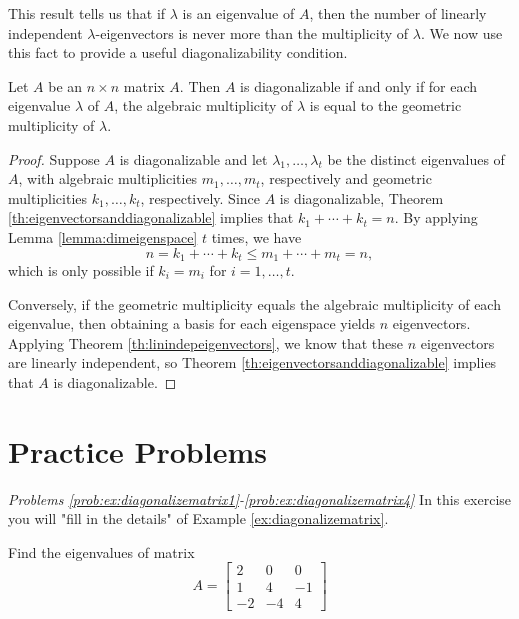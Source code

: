 \documentclass{ximera}
\begin{document}
This result tells us that if $\lambda$ is an eigenvalue of $A$, then
the number of linearly independent $\lambda$-eigenvectors
is never more than the multiplicity of $\lambda$. We now use this fact to provide a useful diagonalizability condition.

\begin{theorem}\label{th:diagonalizability}
Let $A$ be an $n \times n$ matrix $A$. Then $A$ is diagonalizable if and only if for each eigenvalue $\lambda$ of $A$, the algebraic multiplicity of $\lambda$ is equal to the geometric multiplicity of $\lambda$.
\end{theorem}

\begin{proof}
Suppose $A$ is diagonalizable and let $\lambda_1, \ldots, \lambda_t$ be the distinct eigenvalues of $A$, with algebraic multiplicities $m_1, \ldots, m_t$, respectively and geometric multiplicities $k_1, \ldots, k_t$, respectively.  Since $A$ is diagonalizable, Theorem \ref{th:eigenvectorsanddiagonalizable} implies that $ k_1+\cdots+k_t=n$.  By applying Lemma \ref{lemma:dimeigenspace} $t$ times, we have
$$n = k_1+\cdots+k_t \le m_1+\cdots+m_t = n,$$
which is only possible if $k_i=m_i$ for $i=1,\ldots,t$.

Conversely, if the geometric multiplicity equals the algebraic multiplicity of each eigenvalue, then obtaining a basis for each eigenspace yields $n$ eigenvectors.  Applying Theorem \ref{th:linindepeigenvectors}, we know that these $n$ eigenvectors are linearly independent, so Theorem \ref{th:eigenvectorsanddiagonalizable} implies that $A$ is diagonalizable.
\end{proof}

\section*{Practice Problems}
\emph{Problems \ref{prob:ex:diagonalizematrix1}-\ref{prob:ex:diagonalizematrix4}}
In this exercise you will "fill in the details" of Example \ref{ex:diagonalizematrix}.

\begin{problem}\label{prob:ex:diagonalizematrix1}
Find the eigenvalues of matrix 
\begin{equation*}
A=\begin{bmatrix}
2 & 0 & 0 \\
1 & 4 & -1 \\
-2 & -4 & 4
\end{bmatrix}
\end{equation*}
\end{problem} 
\end{document}
